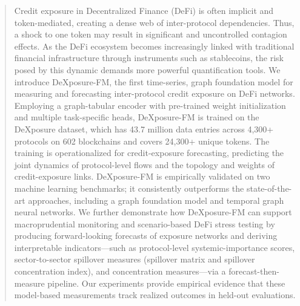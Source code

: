 \documentclass[preprint,12pt]{elsarticle}
\begin{document}
\begin{frontmatter}






\begin{abstract}
Credit exposure in Decentralized Finance (DeFi) is often implicit and token-mediated, creating a dense web of inter-protocol dependencies. Thus, a shock to one token may result in significant and uncontrolled contagion effects. As the DeFi ecosystem becomes increasingly linked with traditional financial infrastructure through instruments such as stablecoins, the risk posed by this dynamic demands more powerful quantification tools. We introduce DeXposure-FM, the first time-series, graph foundation model for measuring and forecasting inter-protocol credit exposure on DeFi networks. Employing a graph-tabular encoder with pre-trained weight initialization and multiple task-specific heads, DeXposure-FM is trained on the DeXposure dataset, which has 43.7 million data entries across 4,300+ protocols on 602 blockchains and covers 24,300+ unique tokens. The training is operationalized for credit-exposure forecasting, predicting the joint dynamics of protocol-level flows and the topology and weights of credit-exposure links. DeXposure-FM is empirically validated on two machine learning benchmarks; it consistently outperforms the state-of-the-art approaches, including a graph foundation model and temporal graph neural networks. We further demonstrate how DeXposure-FM can support macroprudential monitoring and scenario-based DeFi stress testing by producing forward-looking forecasts of exposure networks and deriving interpretable indicators---such as protocol-level systemic-importance scores, sector-to-sector spillover measures (spillover matrix and spillover concentration index), and concentration measures---via a forecast-then-measure pipeline. Our experiments provide empirical evidence that these model-based measurements track realized outcomes in held-out evaluations.


\end{abstract}
\end{frontmatter}
\end{document}
